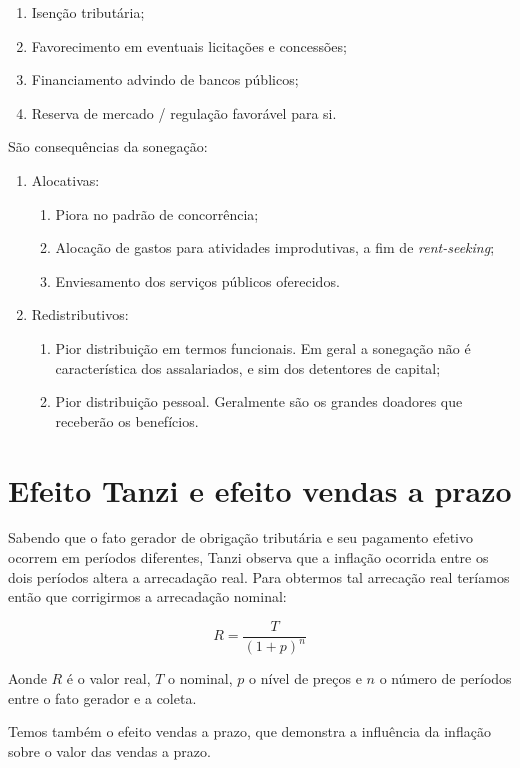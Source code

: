 \documentclass[12pt,a4paper,oneside,brazil]{abntex2}
\begin{document}
\begin{enumerate}
	\item Isenção tributária;
	\item Favorecimento em eventuais licitações e concessões;
	\item Financiamento advindo de bancos públicos;
	\item Reserva de mercado / regulação favorável para si.
\end{enumerate}

São consequências da sonegação:
\begin{enumerate}
	\item Alocativas:
	\begin{enumerate}
		\item Piora no padrão de concorrência;
		\item Alocação de gastos para atividades improdutivas, a fim de \emph{rent-seeking};
		\item Enviesamento dos serviços públicos oferecidos.
	\end{enumerate}
	\item Redistributivos:
	\begin{enumerate}
		\item Pior distribuição em termos funcionais. Em geral a sonegação não é característica dos assalariados, e sim dos detentores de capital;
		\item Pior distribuição pessoal. Geralmente são os grandes doadores que receberão os benefícios.
	\end{enumerate}
\end{enumerate}

\section{Efeito Tanzi e efeito vendas a prazo}
Sabendo que o fato gerador de obrigação tributária e seu pagamento efetivo ocorrem em períodos diferentes, Tanzi observa que a inflação ocorrida entre os dois períodos altera a arrecadação real. Para obtermos tal arrecação real teríamos então que corrigirmos a arrecadação nominal:

\begin{equation} \label{Tanzi}
	R = \frac{T}{(1 + p)^n}
\end{equation}

Aonde $R$ é o valor real, $T$ o nominal, $p$ o nível de preços e $n$ o número de períodos entre o fato gerador e a coleta.

Temos também o efeito vendas a prazo, que demonstra a influência da inflação sobre o valor das vendas a prazo.
\end{document}
